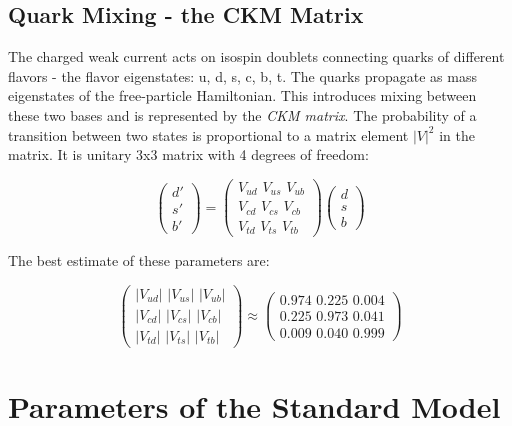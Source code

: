 \subsection{Quark Mixing - the CKM Matrix}

The charged weak current acts on isospin doublets connecting quarks of different flavors - the flavor eigenstates: u, d, s, c, b, t. The quarks propagate as mass eigenstates of the free-particle Hamiltonian. This introduces mixing between these two bases and is represented by the \textit{CKM matrix}. The probability of a transition between two states is proportional to a matrix element $|V|^{2}$ in the matrix. It is unitary 3x3 matrix with 4 degrees of freedom:

\begin{equation}
\label{eq:ckmv}
\begin{pmatrix} d' \\ s' \\ b' \end{pmatrix} =
\begin{pmatrix} V_{ud} \,\, V_{us}  \,\, V_{ub} \\ V_{cd} \,\, V_{cs} \,\, V_{cb}  \\ V_{td} \,\, V_{ts} \,\, V_{tb} \end{pmatrix}
\begin{pmatrix} d \\ s \\ b \end{pmatrix}
\end{equation}

The best estimate of these parameters are:

\begin{equation}
\label{eq:ckmval}
\begin{pmatrix} |V_{ud}| \,\, |V_{us}|  \,\, |V_{ub}| \\ |V_{cd}| \,\, |V_{cs}| \,\, |V_{cb}|  \\ |V_{td}| \,\, |V_{ts}| \,\, |V_{tb}| \end{pmatrix} \approx
\begin{pmatrix} 0.974 \,\, 0.225  \,\, 0.004 \\ 0.225 \,\, 0.973 \,\, 0.041  \\ 0.009 \,\, 0.040 \,\, 0.999 \end{pmatrix}
\end{equation}

\section{Parameters of the Standard Model}

